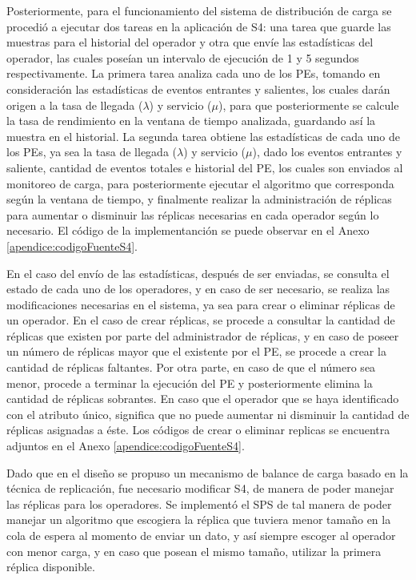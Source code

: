 Posteriormente, para el funcionamiento del sistema de distribución de carga se procedió a ejecutar dos tareas en la aplicación de S4: una tarea que guarde las muestras para el historial del operador y otra que envíe las estadísticas del operador, las cuales poseían un intervalo de ejecución de 1 y 5 segundos respectivamente. La primera tarea analiza cada uno de los PEs, tomando en consideración las estadísticas de eventos entrantes y salientes, los cuales darán origen a la tasa de llegada ($\lambda$) y servicio ($\mu$), para que posteriormente se calcule la tasa de rendimiento en la ventana de tiempo analizada, guardando así la muestra en el historial. La segunda tarea obtiene las estadísticas de cada uno de los PEs, ya sea la tasa de llegada ($\lambda$) y servicio ($\mu$), dado los eventos entrantes y saliente, cantidad de eventos totales e historial del PE, los cuales son enviados al monitoreo de carga, para posteriormente ejecutar el algoritmo que corresponda según la ventana de tiempo, y finalmente realizar la administración de réplicas para aumentar o disminuir las réplicas necesarias en cada operador según lo necesario. El código de la implementanción se puede observar en el Anexo \ref{apendice:codigoFuenteS4}.

En el caso del envío de las estadísticas, después de ser enviadas, se consulta el estado de cada uno de los operadores, y en caso de ser necesario, se realiza las modificaciones necesarias en el sistema, ya sea para crear o eliminar réplicas de un operador. En el caso de crear réplicas, se procede a consultar la cantidad de réplicas que existen por parte del administrador de réplicas, y en caso de poseer un número de réplicas mayor que el existente por el PE, se procede a crear la cantidad de réplicas faltantes. Por otra parte, en caso de que el número sea menor, procede a terminar la ejecución del PE y posteriormente elimina la cantidad de réplicas sobrantes. En caso que el operador que se haya identificado con el atributo único, significa que no puede aumentar ni disminuir la cantidad de réplicas asignadas a éste. Los códigos de crear o eliminar replicas se encuentra adjuntos en el Anexo \ref{apendice:codigoFuenteS4}.

Dado que en el diseño se propuso un mecanismo de balance de carga basado en la técnica de replicación, fue necesario modificar S4, de manera de poder manejar las réplicas para los operadores. Se implementó el SPS de tal manera de poder manejar un algoritmo que escogiera la réplica que tuviera menor tamaño en la cola de espera al momento de enviar un dato, y así siempre escoger al operador con menor carga, y en caso que posean el mismo tamaño, utilizar la primera réplica disponible.

